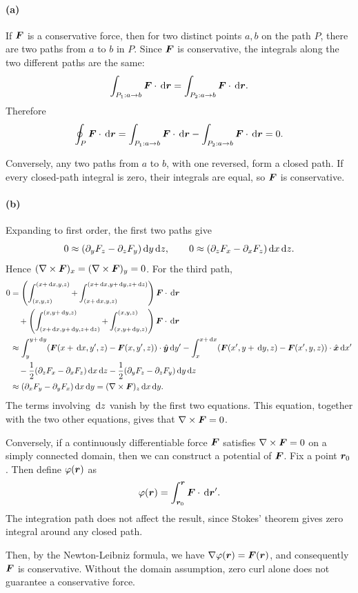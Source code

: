 \documentclass{article}
\begin{document}
\begin{solution}
	\paragraph{(a)} If $\boldsymbol{F}$ is a conservative force, then for two distinct points $a,b$ on the path $P$, there are two paths from $a$ to $b$ in $P$. Since $\boldsymbol{F}$ is conservative, the integrals along the two different paths are the same:
	\[ \int_{P_1: a \to b} \boldsymbol{F} \cdot \,\mathrm{d} \boldsymbol{r} = \int_{P_2: a \to b} \boldsymbol{F} \cdot \,\mathrm{d} \boldsymbol{r}. \]
	Therefore
	\[ \oint_{P} \boldsymbol{F} \cdot \,\mathrm{d}\boldsymbol{r} = \int_{P_1: a \to b} \boldsymbol{F} \cdot \,\mathrm{d} \boldsymbol{r} - \int_{P_2: a \to b} \boldsymbol{F} \cdot \,\mathrm{d} \boldsymbol{r} = 0. \]

	Conversely, any two paths from $a$ to $b$, with one reversed, form a closed path. If every closed-path integral is zero, their integrals are equal, so $\boldsymbol{F}$ is conservative.

	\paragraph{(b)} Expanding to first order, the first two paths give
	\[ 0 \approx (\partial_y F_z-\partial_z F_y)\,\mathrm{d} y\,\mathrm{d} z, \qquad
	0 \approx (\partial_z F_x-\partial_x F_z)\,\mathrm{d} x\,\mathrm{d} z. \]
	Hence $(\nabla\times\boldsymbol{F})_x=(\nabla\times\boldsymbol{F})_y=0$. For the third path,
	\begin{align*}
		0
		&= \left( \int_{(x,y,z)}^{(x+\,\mathrm{d} x,y,z)} + \int_{(x+\,\mathrm{d} x,y,z)}^{(x+\,\mathrm{d} x, y+\,\mathrm{d} y, z+\,\mathrm{d} z)} \right) \boldsymbol{F}\cdot\,\mathrm{d}\boldsymbol{r} \\
		&\quad + \left( \int_{(x+\,\mathrm{d} x, y+\,\mathrm{d} y, z+\,\mathrm{d} z)}^{(x, y+\,\mathrm{d} y, z)} + \int_{(x, y+\,\mathrm{d} y, z)}^{(x,y,z)} \right) \boldsymbol{F}\cdot\,\mathrm{d}\boldsymbol{r} \\
		&\approx \int_{y}^{y+\,\mathrm{d} y} (\boldsymbol{F}(x+\,\mathrm{d} x,y',z)-\boldsymbol{F}(x,y',z))\cdot\hat{\boldsymbol{y}}\,\mathrm{d} y'
		- \int_{x}^{x+\,\mathrm{d} x} (\boldsymbol{F}(x',y+\,\mathrm{d} y,z)-\boldsymbol{F}(x',y,z))\cdot\hat{\boldsymbol{x}}\,\mathrm{d} x' \\
		&\quad -\frac12(\partial_z F_x-\partial_x F_z)\,\mathrm{d} x\,\mathrm{d} z
		-\frac12(\partial_y F_z-\partial_z F_y)\,\mathrm{d} y\,\mathrm{d} z \\
		&\approx (\partial_x F_y-\partial_y F_x)\,\mathrm{d} x\,\mathrm{d} y
		=(\nabla\times\boldsymbol{F})_z\,\mathrm{d} x\,\mathrm{d} y.
	\end{align*}
	The terms involving $\,\mathrm{d} z$ vanish by the first two equations. This equation, together with the two other equations, gives that $\nabla\times\boldsymbol{F}=0$.

	Conversely, if a continuously differentiable force $\boldsymbol{F}$ satisfies $\nabla\times\boldsymbol{F}=0$ on a simply connected domain, then we can construct a potential of $\boldsymbol{F}$. Fix a point $\boldsymbol{r}_0$. Then define $\varphi(\boldsymbol{r})$ as
	\[ \varphi(\boldsymbol{r}) = \int_{\boldsymbol{r}_0}^{\boldsymbol{r}} \boldsymbol{F}\cdot\,\mathrm{d}\boldsymbol{r}'. \]
	The integration path does not affect the result, since Stokes' theorem gives zero integral around any closed path.

	Then, by the Newton-Leibniz formula, we have $\nabla\varphi(\boldsymbol{r})=\boldsymbol{F}(\boldsymbol{r})$, and consequently $\boldsymbol{F}$ is conservative. Without the domain assumption, zero curl alone does not guarantee a conservative force.
\end{solution}
\end{document}
